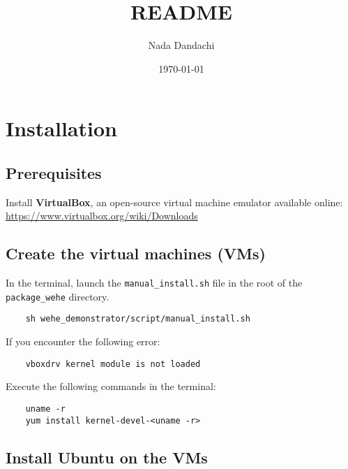 \documentclass[11pt]{article}
\author{Nada Dandachi}
\date{\today}
\title{README}
\begin{document}
\maketitle
\tableofcontents
\clearpage


\section{Installation}
\label{sec:org8bb410e}


\subsection{Prerequisites}
\label{sec:org81d40dc}

Install \textbf{VirtualBox}, an open-source virtual machine emulator available online:
\url{https://www.virtualbox.org/wiki/Downloads}


\subsection{Create the virtual machines (VMs)}
\label{sec:org1b35f14}

In the terminal, launch the \texttt{manual\_install.sh} file in the root of the \texttt{package\_wehe} directory. 
\begin{verbatim}
    sh wehe_demonstrator/script/manual_install.sh
\end{verbatim}

If you encounter the following error:
\begin{verbatim}
    vboxdrv kernel module is not loaded
\end{verbatim}

Execute the following commands in the terminal:
\begin{verbatim}
    uname -r
    yum install kernel-devel-<uname -r>
\end{verbatim}



\subsection{Install Ubuntu on the VMs}
\label{sec:org7b66673}
\end{document}
